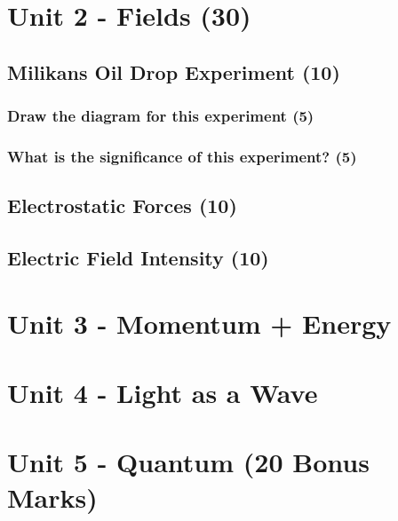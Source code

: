 \documentclass{article}
\begin{document}
\section{Unit 2 - Fields (30)}
\subsection{Milikans Oil Drop Experiment (10)}
\subsubsection{Draw the diagram for this experiment (5)}
\subsubsection{What is the significance of this experiment? (5)}
\subsection{Electrostatic Forces (10)}
\subsection{Electric Field Intensity (10)}


\section{Unit 3 - Momentum + Energy}



\section{Unit 4 - Light as a Wave}



\section{Unit 5 - Quantum (20 Bonus Marks)}
\end{document}
